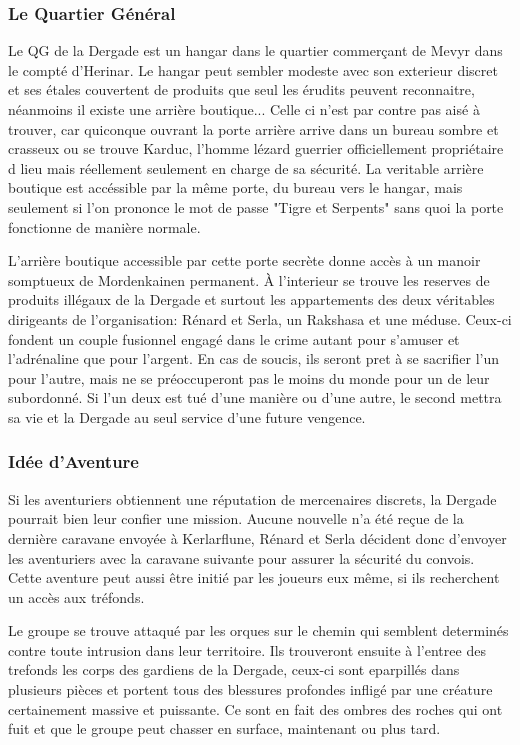 \subsubsection*{Le Quartier Général}

Le QG de la Dergade est un hangar dans le quartier commerçant de Mevyr dans
le compté d'Herinar. Le hangar peut sembler modeste avec son exterieur 
discret et ses étales couvertent de produits que seul les érudits peuvent
reconnaitre, néanmoins il existe une arrière boutique... Celle ci n'est
par contre pas aisé à trouver, car quiconque ouvrant la porte arrière arrive
dans un bureau sombre et crasseux ou se trouve Karduc, l'homme lézard guerrier
officiellement propriétaire d lieu mais réellement seulement en charge de sa 
sécurité. La veritable arrière boutique est accéssible par la même porte,
du bureau vers le hangar, mais seulement si l'on prononce le mot de passe
"Tigre et Serpents" sans quoi la porte fonctionne de manière normale.  

L'arrière boutique accessible par cette porte secrète donne accès à un manoir
somptueux de Mordenkainen permanent. À l'interieur se trouve les reserves
de produits illégaux de la Dergade et surtout les appartements des deux
véritables dirigeants de l'organisation: Rénard et Serla, un Rakshasa et une
méduse. Ceux-ci fondent un couple fusionnel engagé dans le crime autant pour
s'amuser et l'adrénaline que pour l'argent. En cas de soucis, ils seront pret
à se sacrifier l'un pour l'autre, mais ne se préoccuperont pas le moins du 
monde pour un de leur subordonné. Si l'un deux est tué d'une manière ou 
d'une autre, le second mettra sa vie et la Dergade au seul service d'une 
future vengence. 


\subsubsection*{Idée d'Aventure}

Si les aventuriers obtiennent une réputation de mercenaires discrets, la
Dergade pourrait bien leur confier une mission. Aucune nouvelle n'a été
reçue de la dernière caravane envoyée à Kerlarflune, Rénard et Serla 
décident donc d'envoyer les aventuriers avec la caravane suivante pour 
assurer la sécurité du convois. Cette aventure peut aussi être initié 
par les joueurs eux même, si ils recherchent un accès aux tréfonds.

Le groupe se trouve attaqué par les orques sur le chemin qui semblent 
determinés contre toute intrusion dans leur 
territoire. Ils trouveront ensuite à l'entree des trefonds les corps des 
gardiens de la Dergade, ceux-ci sont eparpillés dans plusieurs pièces et 
portent tous des blessures profondes infligé par une créature certainement 
massive et puissante. Ce sont en fait des ombres des roches qui ont fuit
et que le groupe peut chasser en surface, maintenant ou plus tard. 

